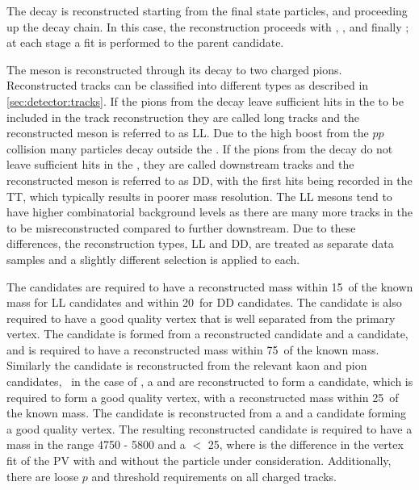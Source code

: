 The decay is reconstructed starting from the final state particles, and proceeding up the decay chain. In this case, the reconstruction proceeds with \decay{\KS}{\pim\pim}, \decay{\Kstarm}{\KS\pim}, \decay{\Dz}{\Km\pip} and finally \decay{\Bm}{\D\Kstarm}; at each stage a fit is performed to the parent candidate.

The \KS meson is reconstructed through its decay to two charged pions. Reconstructed tracks can be classified into different types as described in \sect\ref{sec:detector:tracks}. If the pions from the \KS decay leave sufficient hits in the \velo to be included in the track reconstruction they are called long tracks and the reconstructed \KS meson is referred to as LL. Due to the high boost from the $pp$ collision many \KS particles decay outside the \velo. If the pions from the \KS decay do not leave sufficient hits in the \velo, they are called downstream tracks and the reconstructed \KS meson is referred to as DD, with the first hits being recorded in the TT, which typically results in poorer mass resolution. The LL \KS mesons tend to have higher combinatorial background levels as there are many more tracks in the \velo to be misreconstructed compared to further downstream. Due to these differences, the \KS reconstruction types, LL and DD, are treated as separate data samples and a slightly different selection is applied to each.

The \KS candidates are required to have a reconstructed mass within 15~\mevcc of the known mass for LL \KS candidates and within 20~\mevcc for DD \KS candidates. The \KS candidate is also required to have a good quality vertex that is well separated from the primary vertex. The \Kstarm candidate is formed from a reconstructed \KS candidate and a \pim candidate, and is required to have a reconstructed mass within 75~\mevcc of the known \Kstarm mass. Similarly the \Dz candidate is reconstructed from the relevant kaon and pion candidates, \eg~in the case of \kpi, a \Km and \pip are reconstructed to form a \Dz candidate, which is required to form a good quality vertex, with a reconstructed mass within 25~\mevcc of the known \Dz mass. The \Bm candidate is reconstructed from a \Dz and a \Kstarm candidate forming a good quality vertex. The resulting reconstructed \Bm candidate is required to have a mass in the range 4750 - 5800 \mevcc and a \chisqip $<$ 25, where \chisqip is the difference in the vertex fit \chisq of the PV with and without the particle under consideration. Additionally, there are loose $p$ and \pt threshold requirements on all charged tracks.


